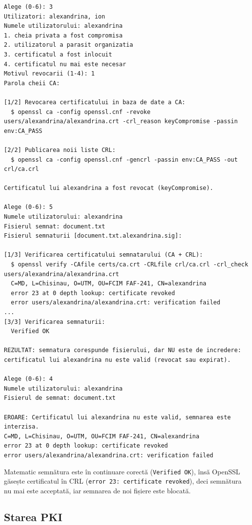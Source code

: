 \documentclass[12pt,a4paper]{article}
\begin{document}
\begin{lstlisting}[style=terminal, caption={Revocarea certificatului și efectul ei}]
Alege (0-6): 3
Utilizatori: alexandrina, ion
Numele utilizatorului: alexandrina
1. cheia privata a fost compromisa
2. utilizatorul a parasit organizatia
3. certificatul a fost inlocuit
4. certificatul nu mai este necesar
Motivul revocarii (1-4): 1
Parola cheii CA:

[1/2] Revocarea certificatului in baza de date a CA:
  $ openssl ca -config openssl.cnf -revoke users/alexandrina/alexandrina.crt -crl_reason keyCompromise -passin env:CA_PASS

[2/2] Publicarea noii liste CRL:
  $ openssl ca -config openssl.cnf -gencrl -passin env:CA_PASS -out crl/ca.crl

Certificatul lui alexandrina a fost revocat (keyCompromise).

Alege (0-6): 5
Numele utilizatorului: alexandrina
Fisierul semnat: document.txt
Fisierul semnaturii [document.txt.alexandrina.sig]:

[1/3] Verificarea certificatului semnatarului (CA + CRL):
  $ openssl verify -CAfile certs/ca.crt -CRLfile crl/ca.crl -crl_check users/alexandrina/alexandrina.crt
  C=MD, L=Chisinau, O=UTM, OU=FCIM FAF-241, CN=alexandrina
  error 23 at 0 depth lookup: certificate revoked
  error users/alexandrina/alexandrina.crt: verification failed
...
[3/3] Verificarea semnaturii:
  Verified OK

REZULTAT: semnatura corespunde fisierului, dar NU este de incredere: certificatul lui alexandrina nu este valid (revocat sau expirat).

Alege (0-6): 4
Numele utilizatorului: alexandrina
Fisierul de semnat: document.txt

EROARE: Certificatul lui alexandrina nu este valid, semnarea este interzisa.
C=MD, L=Chisinau, O=UTM, OU=FCIM FAF-241, CN=alexandrina
error 23 at 0 depth lookup: certificate revoked
error users/alexandrina/alexandrina.crt: verification failed
\end{lstlisting}

Matematic semnătura este în continuare corectă (\texttt{Verified OK}), însă
OpenSSL găsește certificatul în CRL (\texttt{error 23: certificate revoked}),
deci semnătura nu mai este acceptată, iar semnarea de noi fișiere este
blocată.

\subsection{Starea PKI}
\end{document}
